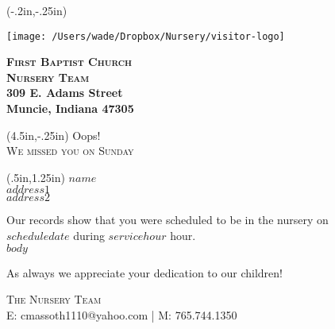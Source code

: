 \documentclass[10pt,letterpaper]{article}
\begin{document}
  
\thispagestyle{empty}

\begin{textblock*}{3in}(-.2in,-.25in)
  \begin{minipage}{.5in}
   \texttt{[image: /Users/wade/Dropbox/Nursery/visitor-logo]}
  \end{minipage}
  \begin{minipage}{1.5in}
  \noindent \bfseries \textsc{First Baptist Church} \\
  \normalfont \textsc{Nursery Team}  \\
  309 E. Adams Street \\
  Muncie, Indiana 47305 \\
  \end{minipage}
\end{textblock*}


\begin{textblock*}{3in}(4.5in,-.25in)
    \fontsize{25}{20}\selectfont Oops! \\
     \fontsize{12}{8}\textsc{We missed you on Sunday}
\end{textblock*}


\begin{textblock*}{3in}(.5in,1.25in)
 \noindent \bfseries \textsc{$name$} \\
 \normalfont $address1$ \\
 $address2$ \\

\end{textblock*}

\vspace{64mm}

\large

\noindent Our records show that you were scheduled to be in the nursery on \\

\textbf{$scheduledate$} during \textbf{$servicehour$} hour. \\

\noindent $body$
 
\noindent As always we appreciate your dedication to our children! 

\vspace{20mm}

\textsc{The Nursery Team} \\ %
\small{E: cmassoth1110@yahoo.com | M: 765.744.1350} %
 
\end{document}
